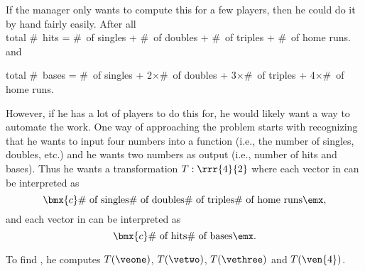 {If the manager only wants to compute this for a few players, then he could do it by hand fairly easily. After all \\


\noindent total \#\ hits = \#\ of singles + \#\ of doubles + \#\ of triples + \#\ of home runs.\\

and \\

\begin{adjustwidth}{0pt}{-40pt}
\noindent total \#\ bases = \#\ of singles + 2$\times$\#\ of doubles + 3$\times$\#\ of triples + 4$\times$\#\ of home runs.\\
\end{adjustwidth}

However, if he has a lot of players to do this for, he would likely want a way to automate the work.  One way of approaching the problem starts with recognizing that he wants to input four numbers into a function (i.e., the number of singles, doubles, etc.) and he wants two numbers as output (i.e., number of hits and bases). Thus he wants a transformation $T:\rrr{4}{2}$ where each vector in  can be interpreted as $$\bmx{c} \text{\#\ of singles} \\\text{\#\ of doubles} \\ \text{\#\ of triples} \\ \text{\#\ of home runs} \emx,$$ and each vector in  can be interpreted as $$\bmx{c} \text{\#\ of hits} \\\text{\#\ of bases} \emx.$$

\drawexampleline%

To find \TT, he computes $T(\veone)$, $T(\vetwo)$, $T(\vethree)$ and $T(\ven{4})$.\\

}
